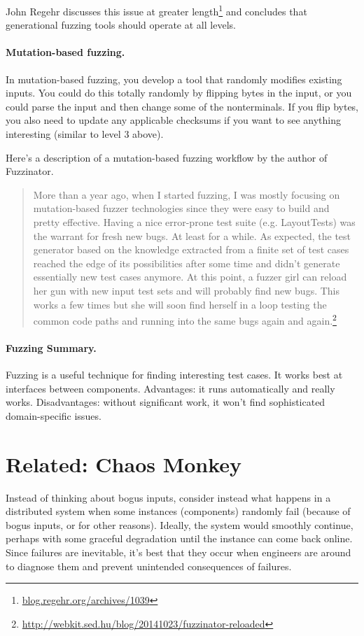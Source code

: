 \documentclass[11pt]{article}
\begin{document}
John Regehr discusses this issue at greater
length\footnote{\url{blog.regehr.org/archives/1039}} and concludes
that generational fuzzing tools should operate at all levels.

\paragraph{Mutation-based fuzzing.}
In mutation-based fuzzing, you develop a tool that randomly modifies existing
inputs. You could do this totally randomly by flipping bytes in the input,
or you could parse the input and then change some of the nonterminals.
If you flip bytes, you also need to update any applicable
checksums if you want to see anything interesting (similar to
level 3 above).

Here's a description of a mutation-based fuzzing workflow by the author of Fuzzinator.
{\small
\begin{quote}
  More than a year ago, when I started fuzzing, I was mostly focusing on mutation-based fuzzer technologies since they were easy to build and pretty effective. Having a nice error-prone test suite (e.g. LayoutTests) was the warrant for fresh new bugs. At least for a while. As expected, the test generator based on the knowledge extracted from a finite set of test cases reached the edge of its possibilities after some time and didn't generate essentially new test cases anymore. At this point, a fuzzer girl can reload her gun with new input test sets and will probably find new bugs. This works a few times but she will soon find herself in a loop testing the common code paths and running into the same bugs again and again.\footnote{\url{http://webkit.sed.hu/blog/20141023/fuzzinator-reloaded}}
\end{quote}
}
\paragraph{Fuzzing Summary.} Fuzzing is a useful technique for finding
interesting test cases. It works best at interfaces between components.
Advantages: it runs automatically and really works. Disadvantages: without
significant work, it won't find sophisticated domain-specific issues.

\section*{Related: Chaos Monkey}
Instead of thinking about bogus inputs, consider instead what happens
in a distributed system when some instances (components) randomly fail
(because of bogus inputs, or for other reasons). Ideally, the system
would smoothly continue, perhaps with some graceful degradation until
the instance can come back online. Since failures are inevitable, it's
best that they occur when engineers are around to diagnose them and
prevent unintended consequences of failures.
\end{document}
